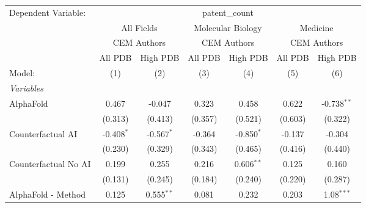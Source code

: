 \begingroup
\centering
\begin{tabular}{lcccccc}
   \tabularnewline \midrule \midrule
   Dependent Variable: & \multicolumn{6}{c}{patent\_count}\\
 & \multicolumn{2}{c}{All Fields} & \multicolumn{2}{c}{Molecular Biology} & \multicolumn{2}{c}{Medicine} \\
\cmidrule(lr){2-3} \cmidrule(lr){4-5} \cmidrule(lr){6-7}
 & \multicolumn{2}{c}{CEM Authors} & \multicolumn{2}{c}{CEM Authors} & \multicolumn{2}{c}{CEM Authors} \\
\cmidrule(lr){2-3} \cmidrule(lr){4-5} \cmidrule(lr){6-7}
 & \multicolumn{1}{c}{All PDB} & \multicolumn{1}{c}{High PDB} & \multicolumn{1}{c}{All PDB} & \multicolumn{1}{c}{High PDB} & \multicolumn{1}{c}{All PDB} & \multicolumn{1}{c}{High PDB} \\
\cmidrule(lr){2-2} \cmidrule(lr){3-3} \cmidrule(lr){4-4} \cmidrule(lr){5-5} \cmidrule(lr){6-6} \cmidrule(lr){7-7}
   Model:                                                     & (1)           & (2)           & (3)           & (4)           & (5)           & (6)\\  
   \midrule
   \emph{Variables}\\
   AlphaFold                                                  & 0.467         & -0.047        & 0.323         & 0.458         & 0.622         & -0.738$^{**}$\\   
                                                              & (0.313)       & (0.413)       & (0.357)       & (0.521)       & (0.603)       & (0.322)\\   
   Counterfactual AI                                          & -0.408$^{*}$  & -0.567$^{*}$  & -0.364        & -0.850$^{*}$  & -0.137        & -0.304\\   
                                                              & (0.230)       & (0.329)       & (0.343)       & (0.465)       & (0.416)       & (0.440)\\   
   Counterfactual No AI                                       & 0.199         & 0.255         & 0.216         & 0.606$^{**}$  & 0.125         & 0.160\\   
                                                              & (0.131)       & (0.245)       & (0.184)       & (0.240)       & (0.220)       & (0.287)\\   
   AlphaFold - Method                                         & 0.125         & 0.555$^{**}$  & 0.081         & 0.232         & 0.203         & 1.08$^{***}$\\   

\end{tabular}
